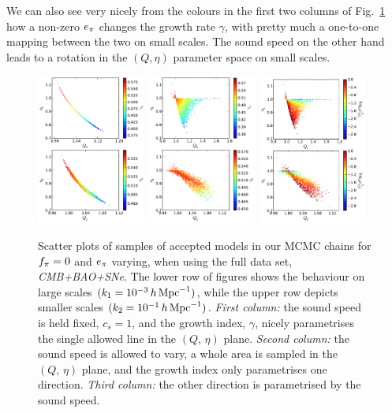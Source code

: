 We can also see very nicely from the colours in the first two columns of Fig.\ \ref{fig:3d} how a non-zero $\aa$ changes the growth
rate $\gamma$, with pretty much a one-to-one mapping between the two on small scales. The sound speed on the other hand leads to a rotation
in the $(Q,\eta)$ parameter space on small scales.

\begin{figure}[tb]
\centering
\includegraphics[width=0.32\textwidth]{figures/chapter-ade/PWHiBSwe0_3D_gamma.pdf}
\includegraphics[width=0.32\textwidth]{figures/chapter-ade/PWHiBSwec_3D_gamma.pdf}
\includegraphics[width=0.32\textwidth]{figures/chapter-ade/PWHiBSwec_3D_ceff.pdf}
\caption{Scatter plots of samples of accepted models in our MCMC chains for $\ff=0$ and $\aa$ varying,  when using the full data set, \emph{CMB+BAO+SNe}. The lower row of figures shows the behaviour on large scales $( k_1 = 10^{-3} \,h\,\Mpc^{-1})$, while the upper row depicts smaller scales $ (k_2 = 10^{-1} \,h\,\Mpc^{-1}) $.  \emph{First column:} the sound speed is held fixed, $c_s=1$, and the growth index, $\gamma$, nicely parametrises the single allowed line in the $(Q,\,\eta)$ plane. \emph{Second column:} the sound speed is allowed to vary, a whole area is sampled in the $(Q,\,\eta)$ plane, and the growth index only parametrises one direction. \emph{Third column:} the other direction is parametrised by the sound speed.}
\label{fig:3d}
\end{figure}

